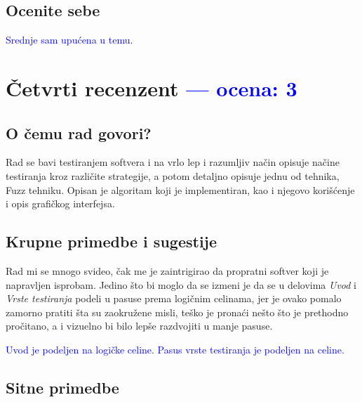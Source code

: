 \documentclass[a4paper]{report}
\newcommand{\odgovor}[1]{\textcolor{blue}{#1}}
\begin{document}
\section{Ocenite sebe} 
\odgovor {Srednje sam upućena u temu.}


\chapter{Četvrti recenzent \odgovor{--- ocena: 3} }

\section{O čemu rad govori?}

Rad se bavi testiranjem softvera i na vrlo lep i razumljiv način opisuje načine testiranja kroz različite strategije, a potom detaljno opisuje jednu od tehnika, Fuzz tehniku. Opisan je algoritam koji je implementiran, kao i njegovo korišćenje i opis grafičkog interfejsa.

\section{Krupne primedbe i sugestije}

Rad mi se mnogo svideo, čak me je zaintrigirao da propratni softver koji je napravljen isprobam. Jedino što bi moglo da se izmeni je da se u delovima \textit{Uvod} i \textit{Vrste testiranja} podeli u pasuse prema logičnim celinama, jer je ovako pomalo zamorno pratiti šta su zaokružene misli, teško je pronaći nešto što je prethodno pročitano, a i vizuelno bi bilo lepše razdvojiti u manje pasuse. 

\odgovor {
Uvod je podeljen na logičke celine.
Pasus vrste testiranja je podeljen na celine.
}

\section{Sitne primedbe}
\end{document}
